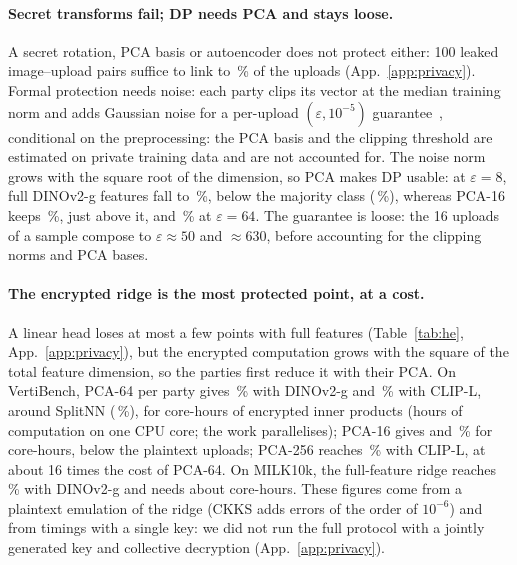 \paragraph{Secret transforms fail; DP needs PCA and stays loose.}
A secret rotation, PCA basis or autoencoder does not protect either: 100 leaked image--upload pairs suffice to link \gdPcaLinkOneZeroZero{} to \gdAeLinkOneZeroZero\,\% of the uploads (App.~\ref{app:privacy}). Formal protection needs noise: each party clips its vector at the median training norm and adds Gaussian noise for a per-upload $(\varepsilon,10^{-5})$ guarantee~\cite{dong2022gdp}, conditional on the preprocessing: the PCA basis and the clipping threshold are estimated on private training data and are not accounted for. The noise norm grows with the square root of the dimension, so PCA makes DP usable: at $\varepsilon=8$, full DINOv2-g features fall to \dpFullEight\,\%, below the majority class (\majVB\,\%), whereas PCA-16 keeps \dpStEight\,\%, just above it, and \dpStSsf\,\% at $\varepsilon=64$. The guarantee is loose: the 16 uploads of a sample compose to $\varepsilon\approx50$ and $\approx630$, before accounting for the clipping norms and PCA bases.

\paragraph{The encrypted ridge is the most protected point, at a cost.}\label{sec:he}
A linear head loses at most a few points with full features (Table~\ref{tab:he}, App.~\ref{app:privacy}), but the encrypted computation grows with the square of the total feature dimension, so the parties first reduce it with their PCA. On VertiBench, PCA-64 per party gives \heVbGRidgeSf\,\% with DINOv2-g and \heVbCRidgeSf\,\% with CLIP-L, around SplitNN (\reproAcc\,\%), for \hcVbSfServerH{} core-hours of encrypted inner products (hours of computation on one CPU core; the work parallelises); PCA-16 gives \heVbGRidgeSt{} and \heVbCRidgeSt\,\% for \hcVbStServerH{} core-hours, below the plaintext uploads; PCA-256 reaches \frVbHeBest\,\% with CLIP-L, at about 16 times the cost of PCA-64. On MILK10k, the full-feature ridge reaches \frMilkHeBest\,\% with DINOv2-g and needs about \hcMilkFullH{} core-hours. These figures come from a plaintext emulation of the ridge (CKKS adds errors of the order of $10^{-6}$) and from timings with a single key: we did not run the full protocol with a jointly generated key and collective decryption (App.~\ref{app:privacy}).
